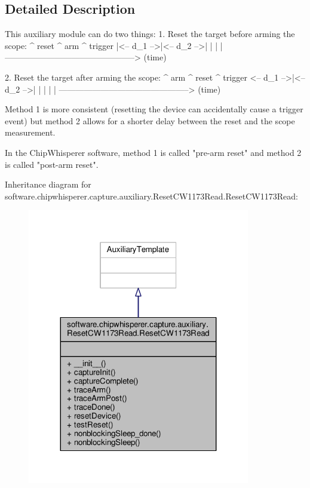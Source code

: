 \subsection{Detailed Description}
\begin{DoxyVerb}This auxiliary module can do two things:
  1. Reset the target before arming the scope:
         ^ reset     ^ arm       ^ trigger
         |<-- d_1 -->|<-- d_2 -->|
         |           |           |
  -----------------------------------------------> (time)
  
  2. Reset the target after arming the scope:
                     ^ arm       ^ reset ^ trigger
          <-- d_1 -->|<-- d_2 -->|       |
                     |           |       |
  -----------------------------------------------> (time)
  
Method 1 is more consistent (resetting the device can accidentally cause
a trigger event) but method 2 allows for a shorter delay between the reset
and the scope measurement. 

In the ChipWhisperer software, method 1 is called "pre-arm reset" and 
method 2 is called "post-arm reset".
\end{DoxyVerb}
 

Inheritance diagram for software.\+chipwhisperer.\+capture.\+auxiliary.\+Reset\+C\+W1173\+Read.\+Reset\+C\+W1173\+Read\+:\nopagebreak
\begin{figure}[H]
\begin{center}
\leavevmode
\includegraphics[width=275pt]{d0/d0a/classsoftware_1_1chipwhisperer_1_1capture_1_1auxiliary_1_1ResetCW1173Read_1_1ResetCW1173Read__inherit__graph}
\end{center}
\end{figure}


